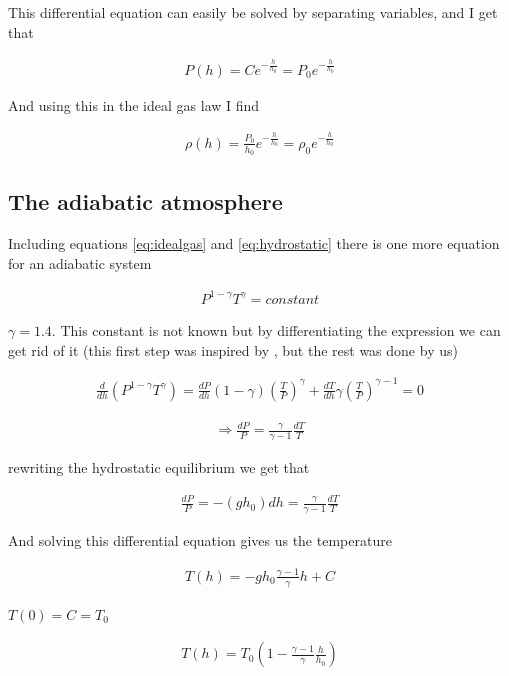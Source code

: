 \documentclass[a4paper, 10pt]{article}
\begin{document}
This differential equation can easily be solved by separating variables, and I get that

\begin{align}
P(h) = C e^{-\frac{h}{h_0}} = P_0 e^{-\frac{h}{h_0}}
\end{align}

And using this in the ideal gas law I find

\begin{align}
\rho (h) = \frac{P_0}{h_0} e^{-\frac{h}{h_0}} = \rho_0 e^{-\frac{h}{h_0}}
\end{align}

\subsection{The adiabatic atmosphere}
Including equations \ref{eq:idealgas} and \ref{eq:hydrostatic} there is one more equation for an adiabatic system

\begin{align}\label{eq:abiabatic}
P^{1-\gamma}T^{\gamma} = constant
\end{align}

$\gamma = 1.4$. This constant is not known but by differentiating the expression we can get rid of it (this first step was inspired by \cite{adia}, but the rest was done by us)

\begin{align}
\frac{d}{dh}(P^{1-\gamma}T^{\gamma}) = \frac{dP}{dh}(1-\gamma)\left(\frac{T}{P} \right)^{\gamma} + \frac{dT}{dh}\gamma \left(\frac{T}{P} \right)^{\gamma-1} = 0
\end{align}

\begin{align}
\Rightarrow \frac{dP}{P} = \frac{\gamma}{\gamma - 1}\frac{dT}{T}
\end{align}

rewriting the hydrostatic equilibrium we get that

\begin{align}
\frac{dP}{P} = -(g h_0) dh = \frac{\gamma}{\gamma - 1}\frac{dT}{T}
\end{align}

And solving this differential equation gives us the temperature

\begin{align}
T(h) = -g h_0 \frac{\gamma-1}{\gamma}h + C
\end{align}

$T(0) = C = T_0$

\begin{align}\label{eq:adiatemp}
T(h) = T_0 \left( 1 -\frac{\gamma - 1}{\gamma} \frac{h}{h_0} \right)
\end{align}
\end{document}
